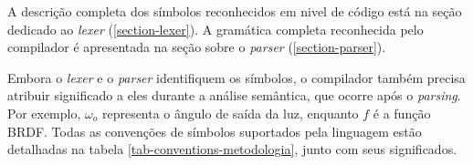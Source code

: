 %
%

A descrição completa dos símbolos reconhecidos em nivel de código está na seção dedicado ao \textit{lexer} (\autoref{section-lexer}). A gramática completa reconhecida pelo compilador é apresentada na seção sobre o \textit{parser} (\autoref{section-parser}).

Embora o \textit{lexer} e o \textit{parser} identifiquem os símbolos, o compilador também precisa atribuir significado a eles durante a análise semântica, que ocorre após o \textit{parsing}. Por exemplo, $\omega_o$ representa o ângulo de saída da luz, enquanto $f$ é a função BRDF. Todas as convenções de símbolos suportados pela linguagem estão detalhadas na tabela \autoref{tab-conventions-metodologia}, junto com seus significados.


